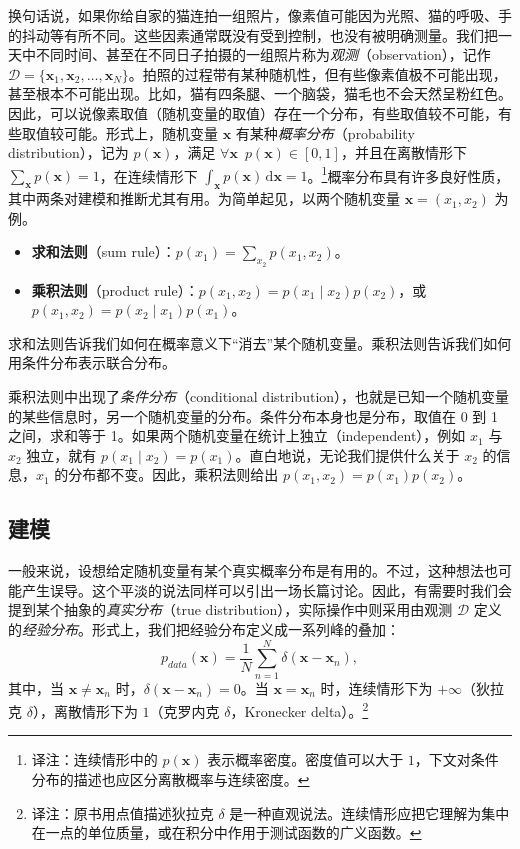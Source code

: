 换句话说，如果你给自家的猫连拍一组照片，像素值可能因为光照、猫的呼吸、手的抖动等有所不同。这些因素通常既没有受到控制，也没有被明确测量。我们把一天中不同时间、甚至在不同日子拍摄的一组照片称为\emph{观测}（observation），记作 $\mathcal{D}=\{\mathbf{x}_1,\mathbf{x}_2,\ldots,\mathbf{x}_N\}$。拍照的过程带有某种随机性，但有些像素值极不可能出现，甚至根本不可能出现。比如，猫有四条腿、一个脑袋，猫毛也不会天然呈粉红色。因此，可以说像素取值（随机变量的取值）存在一个分布，有些取值较不可能，有些取值较可能。形式上，随机变量 $\mathbf{x}$ 有某种\emph{概率分布}（probability distribution），记为 $p(\mathbf{x})$，满足 $\forall\mathbf{x}\enspace p(\mathbf{x})\in[0,1]$，并且在离散情形下 $\sum_{\mathbf{x}} p(\mathbf{x})=1$，在连续情形下 $\int_{\mathbf{x}}p(\mathbf{x})\,\mathrm{d}\mathbf{x}=1$。\footnote{译注：连续情形中的 $p(\mathbf{x})$ 表示概率密度。密度值可以大于 $1$，下文对条件分布的描述也应区分离散概率与连续密度。}概率分布具有许多良好性质，其中两条对建模和推断尤其有用。为简单起见，以两个随机变量 $\mathbf{x}=(x_1,x_2)$ 为例。
\begin{itemize}
\item \textbf{求和法则}（sum rule）：$p(x_1)=\sum_{x_2}p(x_1,x_2)$。
\item \textbf{乘积法则}（product rule）：$p(x_1,x_2)=p(x_1\mid x_2)p(x_2)$，或 $p(x_1,x_2)=p(x_2\mid x_1)p(x_1)$。
\end{itemize}
求和法则告诉我们如何在概率意义下“消去”某个随机变量。乘积法则告诉我们如何用条件分布表示联合分布。

乘积法则中出现了\emph{条件分布}（conditional distribution），也就是已知一个随机变量的某些信息时，另一个随机变量的分布。条件分布本身也是分布，取值在 0 到 1 之间，求和等于 1。如果两个随机变量在统计上独立（independent），例如 $x_1$ 与 $x_2$ 独立，就有 $p(x_1\mid x_2)=p(x_1)$。直白地说，无论我们提供什么关于 $x_2$ 的信息，$x_1$ 的分布都不变。因此，乘积法则给出 $p(x_1,x_2)=p(x_1)p(x_2)$。

\subsection{建模}
一般来说，设想给定随机变量有某个真实概率分布是有用的。不过，这种想法也可能产生误导。这个平淡的说法同样可以引出一场长篇讨论。因此，有需要时我们会提到某个抽象的\emph{真实分布}（true distribution），实际操作中则采用由观测 $\mathcal{D}$ 定义的\emph{经验分布}。形式上，我们把经验分布定义成一系列峰的叠加：
\begin{equation}
p_{\mathit{data}}(\mathbf{x})=\frac1N\sum_{n=1}^{N}\delta(\mathbf{x}-\mathbf{x}_n),
\tag{2.1}\label{eq:02-01}
\end{equation}
其中，当 $\mathbf{x}\neq\mathbf{x}_n$ 时，$\delta(\mathbf{x}-\mathbf{x}_n)=0$。当 $\mathbf{x}=\mathbf{x}_n$ 时，连续情形下为 $+\infty$（狄拉克 $\delta$），离散情形下为 $1$（克罗内克 $\delta$，Kronecker delta）。\footnote{译注：原书用点值描述狄拉克 $\delta$ 是一种直观说法。连续情形应把它理解为集中在一点的单位质量，或在积分中作用于测试函数的广义函数。}

